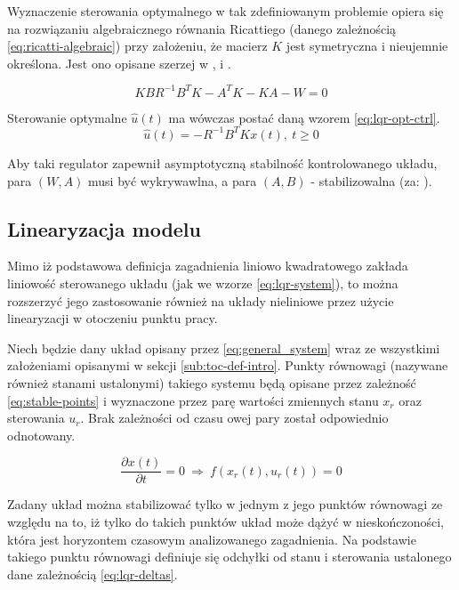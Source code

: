 Wyznaczenie sterowania optymalnego w tak zdefiniowanym problemie opiera się na rozwiązaniu algebraicznego równania Ricattiego (danego zależnością \ref{eq:ricatti-algebraic}) przy założeniu, że macierz $K$ jest symetryczna i nieujemnie określona. Jest ono opisane szerzej w \cite{AthansOptCtrl}, \cite{Korytowski2015} i \cite{Murray2006}.

\begin{equation}\label{eq:ricatti-algebraic}
KBR^{-1}B^{T}K - A^{T}K - KA - W =0
\end{equation}

Sterowanie optymalne $\hat{u}(t)$ ma wówczas postać daną wzorem \ref{eq:lqr-opt-ctrl}.
\begin{equation}\label{eq:lqr-opt-ctrl}
\hat{u}(t) = -R^{-1}B^{T}Kx(t),~ t \geq 0
\end{equation}

Aby taki regulator zapewnił asymptotyczną stabilność kontrolowanego układu, para $(W, A)$ musi być wykrywawlna, a para $(A, B)$ - stabilizowalna (za: \cite{Korytowski2015}).

\subsection{Linearyzacja modelu}
\label{sub:lqr-lin}

Mimo iż podstawowa definicja zagadnienia liniowo kwadratowego zakłada liniowość sterowanego układu (jak we wzorze \ref{eq:lqr-system}), to można rozszerzyć jego zastosowanie również na układy nieliniowe przez użycie linearyzacji w otoczeniu punktu pracy.

Niech będzie dany układ opisany przez \ref{eq:general_system} wraz ze wszystkimi założeniami opisanymi w sekcji \ref{sub:toc-def-intro}.
Punkty równowagi (nazywane również stanami ustalonymi) takiego systemu będą opisane przez zależność \ref{eq:stable-points} i wyznaczone przez parę wartości zmiennych stanu $x_{r}$ oraz sterowania $u_{r}$. Brak zależności od czasu owej pary został odpowiednio odnotowany.

\begin{equation}\label{eq:stable-points}
\frac{\partial x(t)}{\partial t} = 0 ~\Rightarrow~ f(x_{r}(t), u_{r}(t)) = 0
\end{equation}

Zadany układ można stabilizować tylko w jednym z jego punktów równowagi ze względu na to, iż tylko do takich punktów układ może dążyć w nieskończoności, która jest horyzontem czasowym analizowanego zagadnienia.
Na podstawie takiego punktu równowagi definiuje się odchyłki od stanu i sterowania ustalonego dane zależnością \ref{eq:lqr-deltas}.

